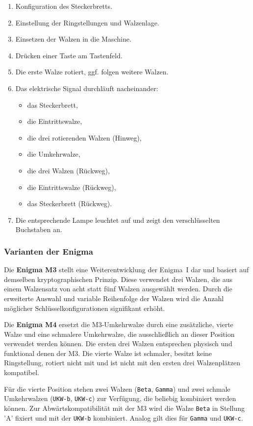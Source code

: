 \documentclass[12pt, ngerman, a4paper, numbers=noenddot]{article}
\begin{document}
\begin{enumerate}
	\item Konfiguration des Steckerbretts.
	\item Einstellung der Ringstellungen und Walzenlage.
	\item Einsetzen der Walzen in die Maschine.
	\item Drücken einer Taste am Tastenfeld.
	\item Die erste Walze rotiert, ggf. folgen weitere Walzen.
	\item Das elektrische Signal durchläuft nacheinander:
	\begin{itemize}
		\item das Steckerbrett,
		\item die Eintrittswalze,
		\item die drei rotierenden Walzen (Hinweg),
		\item die Umkehrwalze,
		\item die drei Walzen (Rückweg),
		\item die Eintrittswalze (Rückweg),
		\item das Steckerbrett (Rückweg).
	\end{itemize}
	\item Die entsprechende Lampe leuchtet auf und zeigt den verschlüsselten Buchstaben an.
\end{enumerate}


\subsubsection{Varianten der Enigma}

Die \textbf{Enigma M3} stellt eine Weiterentwicklung der Enigma~I dar und basiert auf demselben kryptographischen Prinzip. Diese verwendet drei Walzen, die aus einem Walzensatz von acht statt fünf Walzen ausgewählt werden. Durch die erweiterte Auswahl und variable Reihenfolge der Walzen wird die Anzahl möglicher Schlüsselkonfigurationen signifikant erhöht.


Die \textbf{Enigma M4} ersetzt die M3-Umkehrwalze durch eine zusätzliche, vierte Walze und eine schmalere Umkehrwalze, die ausschließlich an dieser Position verwendet werden können. Die ersten drei Walzen entsprechen physisch und funktional denen der M3. Die vierte Walze ist schmaler, besitzt keine Ringstellung, rotiert nicht mit und ist nicht mit den ersten drei Walzenplätzen kompatibel.

Für die vierte Position stehen zwei Walzen (\lstinline|Beta|, \lstinline|Gamma|) und zwei schmale Umkehrwalzen (\lstinline|UKW-b|, \lstinline|UKW-c|) zur Verfügung, die beliebig kombiniert werden können. Zur Abwärtskompatibilität mit der M3 wird die Walze \lstinline|Beta| in Stellung 'A' fixiert und mit der \lstinline|UKW-b| kombiniert. Analog gilt dies für \lstinline|Gamma| und \lstinline|UKW-c|.
\end{document}
